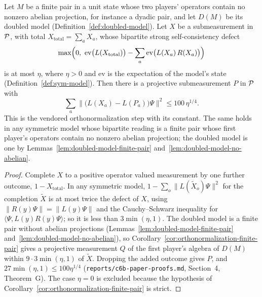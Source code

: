 \begin{theorem}
\label{thm:doubled-orthonormalization}
\leanok
Let $M$ be a finite pair in a unit state whose two players' operators contain no nonzero abelian
projection, for instance a dyadic pair, and let $D(M)$ be its doubled model
(Definition~\ref{def:doubled-model}). Let $X$ be a submeasurement in $\cal{P}$, with total $X_{\mathrm{total}} = \sum_a X_a$, whose
bipartite strong self-consistency defect
\[
  \max\Bigl(0,\ \mathrm{ev}\bigl(L(X_{\mathrm{total}})\bigr) - \sum_a \mathrm{ev}\bigl(L(X_a)\,
  R(X_a)\bigr)\Bigr)
\]
is at most $\eta$, where $\eta > 0$ and $\mathrm{ev}$ is the expectation of the model's state
(Definition~\ref{def:sym-model}). Then there is a projective
submeasurement $P$ in $\cal{P}$ with
\[
  \sum_a \bigl\| \bigl(L(X_a) - L(P_a)\bigr) \Psi \bigr\|^2 \leq 100\, \eta^{1/4}.
\]
This is the vendored orthonormalization step with its constant. The same holds in any symmetric
model whose bipartite reading is a finite pair whose first player's operators contain no nonzero
abelian projection; the doubled model is one by Lemmas~\ref{lem:doubled-model-finite-pair}
and~\ref{lem:doubled-model-no-abelian}.
\end{theorem}

\begin{proof}
\leanok
Complete $X$ to a positive operator valued measurement by one further outcome, $1 -
X_{\mathrm{total}}$. In any symmetric model, $1 - \sum_o \|L(\tilde X_o) \Psi\|^2$ for the completion
$\tilde X$ is at most twice the defect of $X$, using $\|R(y) \Psi\| = \|L(y) \Psi\|$ and the
Cauchy--Schwarz inequality for $\langle \Psi, L(y) R(y) \Psi \rangle$; so it is less than $3
\min(\eta, 1)$. The doubled model is a finite pair without abelian projections
(Lemmas~\ref{lem:doubled-model-finite-pair} and~\ref{lem:doubled-model-no-abelian}), so
Corollary~\ref{cor:orthonormalization-finite-pair} gives a projective measurement $Q$ of the first
player's algebra of $D(M)$ within $9 \cdot 3 \min(\eta, 1)$ of $\tilde X$. Dropping the added
outcome gives $P$, and $27 \min(\eta, 1) \leq 100 \eta^{1/4}$
(\texttt{reports/c6b-paper-proofs.md}, Section~4, Theorem~G). The case $\eta = 0$ is excluded
because the hypothesis of Corollary~\ref{cor:orthonormalization-finite-pair} is strict.
\end{proof}

